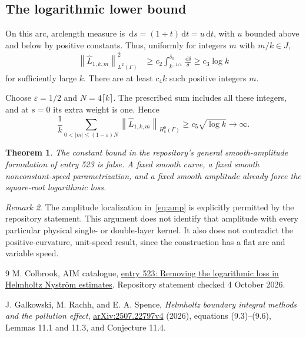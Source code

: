\documentclass[11pt,a4paper]{article}
\newtheorem{theorem}{Theorem}[section]
\theoremstyle{remark}
\newtheorem{remark}[theorem]{Remark}
\newcommand{\eps}{\varepsilon}
\newcommand{\norm}[1]{\left\lVert #1\right\rVert}
\newcommand{\dd}{\,\mathrm d}
\begin{document}
\subsection{The logarithmic lower bound}

On this arc, arclength measure is $\dd s=(1+t)\dd t=u\dd t$, with $u$ bounded above and below by positive constants. Thus, uniformly for integers $m$ with $m/k\in J$,
\begin{align}
 \norm{\widehat L_{1,k,m}}_{L^2(\Gamma)}^2
 &\ge c_2\int_{k^{-1/4}}^{\delta_0}\frac{\dd\delta}{\delta}
 \ge c_3\log k
\end{align}
for sufficiently large $k$. There are at least $c_4k$ such positive integers $m$.

Choose $\eps=1/2$ and $N=4\lceil k\rceil$. The prescribed sum includes all these integers, and at $s=0$ its extra weight is one. Hence
\begin{equation}\label{eq:loglower}
 \frac1k\sum_{0<|m|\le(1-\eps)N}
 \norm{\widehat L_{1,k,m}}_{H_k^0(\Gamma)}
 \ge c_5\sqrt{\log k}\longrightarrow\infty.
\end{equation}

\begin{theorem}
The constant bound in the repository's general smooth-amplitude formulation of entry 523 is false. A fixed smooth curve, a fixed smooth nonconstant-speed parametrization, and a fixed smooth amplitude already force the square-root logarithmic loss.
\end{theorem}

\begin{remark}
The amplitude localization in~\eqref{eq:amp} is explicitly permitted by the repository statement. This argument does not identify that amplitude with every particular physical single- or double-layer kernel. It also does not contradict the positive-curvature, unit-speed result, since the construction has a flat arc and variable speed.
\end{remark}



\begin{thebibliography}{9}
M. Colbrook, AIM catalogue, \href{https://github.com/MColbrook/AIM/blob/59a8f0c2957dd272f56bcf282dfe0c066a15f441/problems/523-nystrom-logarithmic-loss.md}{entry 523: Removing the logarithmic loss in Helmholtz Nystr\"om estimates}. Repository statement checked 4 October 2026.

J. Galkowski, M. Rachh, and E. A. Spence, \emph{Helmholtz boundary integral methods and the pollution effect}, \href{https://arxiv.org/abs/2507.22797v4}{arXiv:2507.22797v4} (2026), equations (9.3)--(9.6), Lemmas 11.1 and 11.3, and Conjecture 11.4.
\end{thebibliography}
\end{document}
